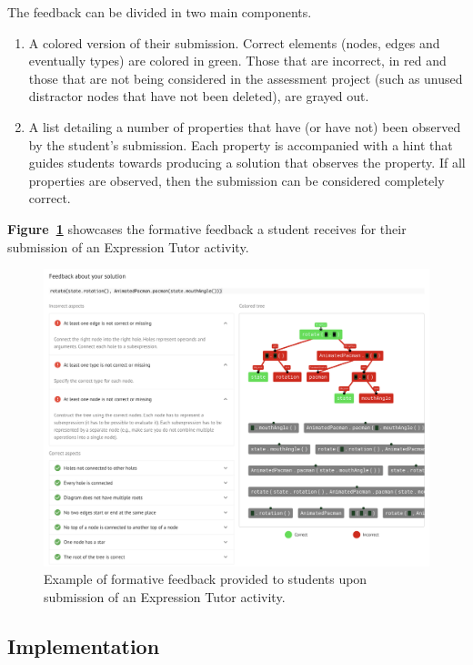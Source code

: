 \begin{chapterBody}
The feedback can be divided in two main components.

\begin{enumerate}
    \item A colored version of their submission. Correct elements (nodes, edges 
and eventually types) are colored in green. Those that are incorrect, in red and
those that are not being considered in the assessment project (such as
unused distractor nodes that have not been deleted), are grayed out.
    \item A list detailing a number of properties that have (or have not) been
observed by the student's submission. Each property is accompanied with a hint
that guides students towards producing a solution that observes the property.
If all properties are observed, then the submission can be considered
completely correct.
\end{enumerate}

\textbf{Figure~\ref{fig:fb-ff-dialog}} showcases the formative feedback a
student receives for their submission of an Expression Tutor activity.

\begin{figure}[ht]
    \centering
    \includegraphics[width=\textwidth]{res/7/ff_example.png}
    \caption{Example of formative feedback provided to students upon
submission of an Expression Tutor activity.}
    \label{fig:fb-ff-dialog}
\end{figure}

\subsection{Implementation}


\end{chapterBody}
